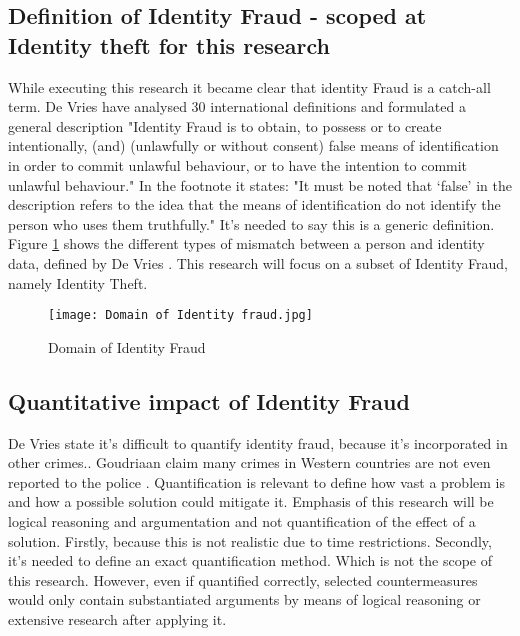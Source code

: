 \subsection{Definition of Identity Fraud - scoped at Identity theft for this research}
While executing this research it became clear that identity Fraud is a catch-all term. De Vries \etal \cite{97408536fd1c4f4e9d1615b7a4a4473e} have analysed 30 international definitions and formulated a general description "Identity Fraud is to obtain, to possess or to create intentionally, (and) (unlawfully or without consent) false means of identification
in order to commit unlawful behaviour, or to have the intention to commit unlawful behaviour." In the footnote it states: "It must be noted that ‘false’ in the description refers to the idea that the means of identification do not identify the person who uses them truthfully." It's needed to say this is a generic definition. Figure \ref{fig:ID_fraud} shows the different types of mismatch between a person and identity data, defined by De Vries \etal \cite{Vries2007IdentiteitsfraudeEA}. This research will focus on a subset of Identity Fraud, namely Identity Theft.
\graphicspath{ {./images/} }
\begin{figure}
\texttt{[image: Domain of Identity fraud.jpg]}\\
\caption{Domain of Identity Fraud}
\label{fig:ID_fraud}
\end{figure}

\subsection{Quantitative impact of Identity Fraud}\label{QI}
De Vries \etal state it's difficult to quantify identity fraud, because it's incorporated in other crimes.\cite{Vries2007IdentiteitsfraudeEA}. Goudriaan \etal claim many crimes in Western countries are not even reported to the police \cite{Gourdriaan_etal}. Quantification is relevant to define how vast a problem is and how a possible solution could mitigate it. Emphasis of this research will be logical reasoning and argumentation and not quantification of the effect of a solution. Firstly, because this is not realistic due to time restrictions. Secondly, it's needed to define an exact quantification method. Which is not the scope of this research. However, even if quantified correctly, selected countermeasures would only contain substantiated arguments by means of logical reasoning or extensive research after applying it.

